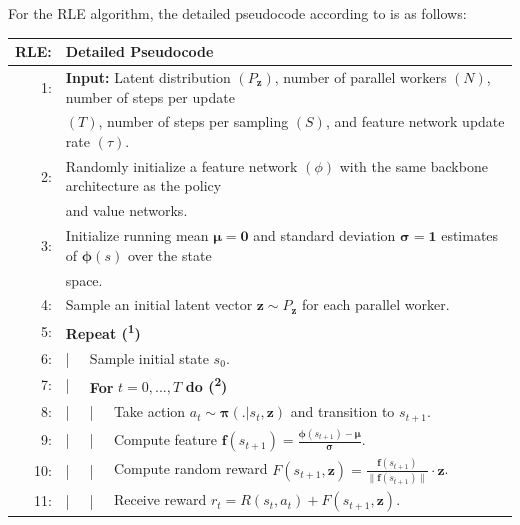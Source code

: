 \noindent For the RLE algorithm, the detailed pseudocode according to \cite{rle-paper} is as follows:

\hypertarget{algo-rle}{
\begin{table}[h!]
  \centering
  \begin{tabular}{rlllll}
    \hline\hline
    \textbf{RLE:} & \multicolumn{5}{l}{Detailed Pseudocode}\\
    \hline
    1: & \multicolumn{5}{l}{\textbf{Input:} Latent distribution $\left(P_{\textbf{z}}\right)$, number of parallel workers $\left(N\right)$, number of steps per update}\\
    & \multicolumn{5}{l}{$\left(T\right)$, number of steps per sampling $\left(S\right)$, and feature network update rate $\left(\tau\right)$.}\\
    2: & \multicolumn{5}{l}{Randomly initialize a feature network $\left(\phi\right)$ with the same backbone architecture as the policy }\\
    & \multicolumn{5}{l}{and value networks.}\\
    3: & \multicolumn{5}{l}{Initialize running mean $\boldsymbol{\mu} = \textbf{0}$ and standard deviation $\boldsymbol{\sigma} = \textbf{1}$ estimates of $\boldsymbol{\phi} \left(s\right)$ over the state}\\
    & \multicolumn{5}{l}{space.}\\
    4: & \multicolumn{5}{l}{Sample an initial latent vector $\textbf{z} \sim P_{\textbf{z}}$ for each parallel worker.}\\
    5: & \multicolumn{5}{l}{\textbf{Repeat (\textsuperscript{1})}}\\
    6: & | & \multicolumn{4}{l}{Sample initial state $s_{0}$.}\\
    7: & | & \multicolumn{4}{l}{\textbf{For} $t = 0, ..., T$ \textbf{do (\textsuperscript{2})}}\\
    8: & | & | & \multicolumn{3}{l}{Take action $a_{t} \sim \boldsymbol{\pi}(. | s_{t}, \textbf{z})$ and transition to $s_{t+1}$.}\\
    9: & | & | & \multicolumn{3}{l}{Compute feature $\textbf{f}(s_{t+1}) = \frac{\boldsymbol{\phi}(s_{t+1}) - \boldsymbol{\mu}}{\boldsymbol{\sigma}}$.}\\
    10: & | & | & \multicolumn{3}{l}{Compute random reward $F(s_{t+1}, \textbf{z}) = \frac{\textbf{f}(s_{t+1})}{\| \textbf{f}(s_{t+1}) \|} \cdot \textbf{z}$.}\\
    11: & | & | & \multicolumn{3}{l}{Receive reward $r_{t} = R(s_{t}, a_{t}) + F(s_{t+1}, \textbf{z})$.}\\

\end{tabular}
\end{table}}
